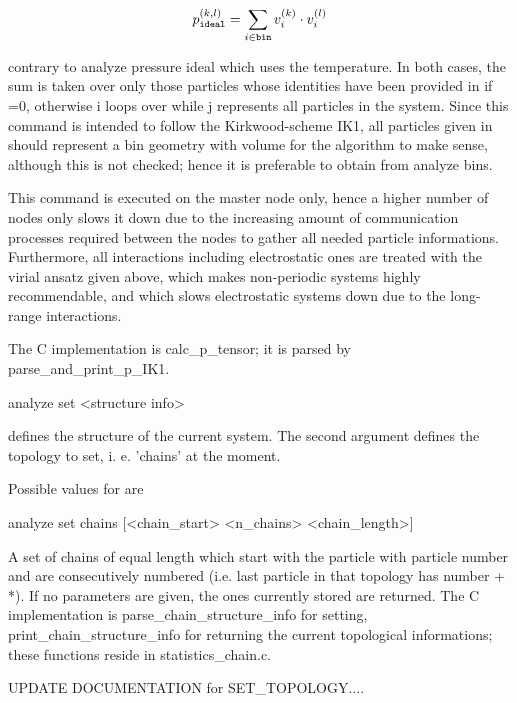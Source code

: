 {\[ p^{(k,l)}_{\tt ideal} = \sum_{i\in {\tt bin}} v_{i}^{(k)} \cdot v_{i}^{(l)} \]

contrary to analyze pressure ideal which uses the temperature. In both cases, the sum is taken over only those particles whose identities have been provided in  if =0, otherwise i loops over  while j represents all particles in the system. Since this command is intended to follow the Kirkwood-scheme IK1, all particles given in  should represent a bin geometry with volume  for the algorithm to make sense, although this is not checked; hence it is preferable to obtain  from analyze bins.

This command is executed on the master node only, hence a higher number of nodes only slows it down due to the increasing amount of communication processes required between the nodes to gather all needed particle informations. Furthermore, all interactions including electrostatic ones are treated with the virial ansatz given above, which makes non-periodic systems highly recommendable, and which slows electrostatic systems down due to the long-range interactions.

The C implementation is calc\_p\_tensor; it is parsed by parse\_and\_print\_p\_IK1. 

\begin{tclcode}
 analyze set <structure info> 
\end{tclcode}
defines the structure of the current system. The second argument defines the topology to set, i. e. 'chains' at the moment.

Possible values for  are
\begin{tclcode}
 analyze set chains [<chain_start> <n_chains> <chain_length>] 
\end{tclcode}
A set of  chains of equal length  which start with the particle with particle number  and are consecutively numbered (i.e. last particle in that topology has number  + *). If no parameters are given, the ones currently stored are returned.
The C implementation is parse\_chain\_structure\_info for setting, print\_chain\_structure\_info for returning the current topological informations; these functions reside in statistics\_chain.c.

UPDATE DOCUMENTATION for SET\_TOPOLOGY....

}
